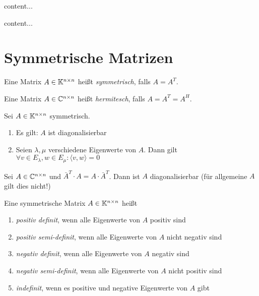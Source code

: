 \begin{satz}
	content...
\end{satz}

\begin{definition}[Singulärwert]
	content...
\end{definition}

\pagebreak

\section{Symmetrische Matrizen}
\begin{definition}
	Eine Matrix $A \in \mathbb{K}^{n \times n}$ heißt \emph{symmetrisch}, falls $A = A^T$.
\end{definition}

\begin{definition}
	Eine Matrix $A \in \mathbb{C}^{n \times n}$ heißt \emph{hermitesch}, falls $A = A^T = A^H$.
\end{definition}

\begin{satz}
	Sei $A \in \mathbb{K}^{n \times n}$ symmetrisch. 
	
	\begin{enumerate}[noitemsep]
		\item Es gilt: $A$ ist diagonalisierbar
		\item Seien $\lambda, \mu$ verschiedene Eigenwerte von $A$. Dann gilt $\forall v \in E_\lambda, w \in E_\mu : \langle v, w \rangle = 0 $
	\end{enumerate}
\end{satz}

\begin{satz}[Spektralsatz]
	Sei $A \in \mathbb{C}^{n \times n}$ und $\bar{A}^T \cdot A = A \cdot \bar{A}^T$. Dann ist $A$ diagonalisierbar (für allgemeine $A$ gilt dies nicht!)
\end{satz}

\begin{definition}
	Eine symmetrische Matrix $A \in \mathbb{K}^{n \times n}$ heißt
	\begin{enumerate}[noitemsep]
		\item \emph{positiv definit}, wenn alle Eigenwerte von $A$ positiv sind
		\item \emph{positiv semi-definit}, wenn alle Eigenwerte von $A$ nicht negativ sind	
		\item \emph{negativ definit}, wenn alle Eigenwerte von $A$ negativ sind
		\item \emph{negativ semi-definit}, wenn alle Eigenwerte von $A$ nicht positiv sind	
		\item \emph{indefinit}, wenn es positive und negative Eigenwerte von $A$ gibt
	\end{enumerate}
\end{definition}

